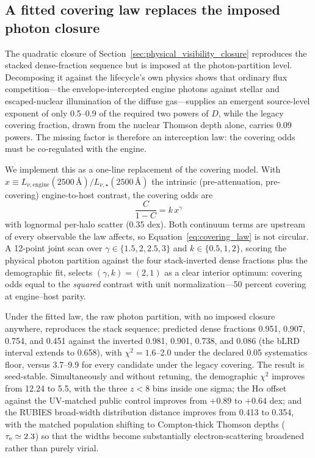 \subsection{A fitted covering law replaces the imposed photon closure}
\label{sec:coregulated_covering}

The quadratic closure of Section~\ref{sec:physical_visibility_closure}
reproduces the stacked dense-fraction sequence but is imposed at the
photon-partition level. Decomposing it against the lifecycle's own physics
shows that ordinary flux competition---the envelope-intercepted engine
photons against stellar and escaped-nuclear illumination of the diffuse
gas---supplies an emergent source-level exponent of only 0.5--0.9 of the
required two powers of $D$, while the legacy covering fraction, drawn from
the nuclear Thomson depth alone, carries 0.09 powers. The missing factor is
therefore an interception law: the covering odds must be co-regulated with
the engine.

We implement this as a one-line replacement of the covering model. With
$x \equiv L_{\nu,\mathrm{engine}}(2500\,\text{\AA}) /
L_{\nu,\star}(2500\,\text{\AA})$ the intrinsic (pre-attenuation,
pre-covering) engine-to-host contrast, the covering odds are
\begin{equation}
  \frac{C}{1-C} = k\,x^{\gamma}
  \label{eq:covering_law}
\end{equation}
with lognormal per-halo scatter (0.35 dex). Both continuum terms are
upstream of every observable the law affects, so
Equation~\ref{eq:covering_law} is not circular. A 12-point joint scan over
$\gamma\in\{1.5,2,2.5,3\}$ and $k\in\{0.5,1,2\}$, scoring the physical
photon partition against the four stack-inverted dense fractions plus the
demographic fit, selects $(\gamma,k)=(2,1)$ as a clear interior optimum:
covering odds equal to the \emph{squared} contrast with unit
normalization---50 percent covering at engine--host parity.

Under the fitted law, the raw photon partition, with no imposed closure
anywhere, reproduces the stack sequence: predicted dense fractions 0.951,
0.907, 0.754, and 0.451 against the inverted 0.981, 0.901, 0.738, and 0.086
(the bLRD interval extends to 0.658), with $\chi^2=1.6$--2.0 under the
declared 0.05 systematics floor, versus 3.7--9.9 for every candidate under
the legacy covering. The result is seed-stable. Simultaneously and without
retuning, the demographic $\chi^2$ improves from 12.24 to 5.5, with the
three $z<8$ bins inside one sigma; the H$\alpha$ offset against the
UV-matched public control improves from $+0.89$ to $+0.64$ dex; and the
RUBIES broad-width distribution distance improves from 0.413 to 0.354, with
the matched population shifting to Compton-thick Thomson depths
($\tau_{\rm e}\simeq2.3$) so that the widths become substantially
electron-scattering broadened rather than purely virial.

